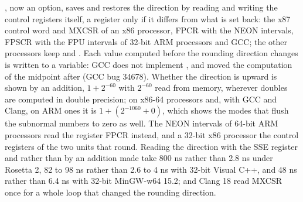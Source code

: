 \documentclass[12pt,a4paper,twoside,openright]{book}
\begin{document}
\medskip
{}, now an option, saves and restores the
direction by reading and writing the control registers itself, a register
only if it differs from what is set back: the x87 control word and MXCSR of
an x86 processor, FPCR with the NEON intervals, FPSCR with the FPU intervals
of 32-bit ARM processors and GCC; the other processors keep
 and . Each value computed before the
rounding direction changes is written to a  variable: GCC does
not implement , and moved the computation of
the midpoint after  (GCC bug 34678). Whether the
direction is upward is shown by an addition, $1 + 2^{-60}$ with $2^{-60}$
read from  memory, wherever doubles are computed in double
precision; on x86-64 processors and, with GCC and Clang, on ARM ones it is
$1 + (2^{-1060} + 0)$, which shows the modes that flush the subnormal numbers
to zero as well. The NEON intervals of 64-bit ARM processors read the
register FPCR instead, and a 32-bit x86 processor the control registers of
the two units that round. Reading the direction with the SSE register and
 rather than by an addition made  take 800 ns
rather than 2.8 ns under Rosetta 2, 82 to 98 ns rather than 2.6 to 4 ns with
32-bit Visual C++, and 48 ns rather than 6.4 ns with 32-bit MinGW-w64 15.2;
and Clang 18 read MXCSR once for a whole loop that changed the rounding
direction.
\end{document}
